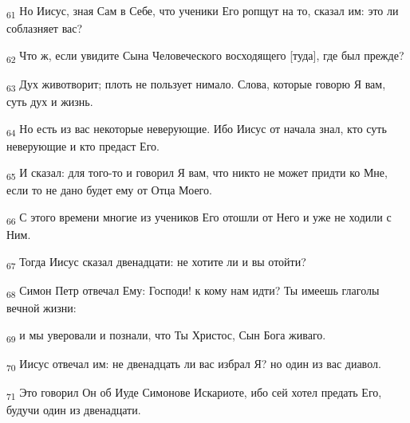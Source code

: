 \begin{tcolorbox}
\textsubscript{61} Но Иисус, зная Сам в Себе, что ученики Его ропщут на то, сказал им: это ли соблазняет вас?
\end{tcolorbox}
\begin{tcolorbox}
\textsubscript{62} Что ж, если увидите Сына Человеческого восходящего [туда], где был прежде?
\end{tcolorbox}
\begin{tcolorbox}
\textsubscript{63} Дух животворит; плоть не пользует нимало. Слова, которые говорю Я вам, суть дух и жизнь.
\end{tcolorbox}
\begin{tcolorbox}
\textsubscript{64} Но есть из вас некоторые неверующие. Ибо Иисус от начала знал, кто суть неверующие и кто предаст Его.
\end{tcolorbox}
\begin{tcolorbox}
\textsubscript{65} И сказал: для того-то и говорил Я вам, что никто не может придти ко Мне, если то не дано будет ему от Отца Моего.
\end{tcolorbox}
\begin{tcolorbox}
\textsubscript{66} С этого времени многие из учеников Его отошли от Него и уже не ходили с Ним.
\end{tcolorbox}
\begin{tcolorbox}
\textsubscript{67} Тогда Иисус сказал двенадцати: не хотите ли и вы отойти?
\end{tcolorbox}
\begin{tcolorbox}
\textsubscript{68} Симон Петр отвечал Ему: Господи! к кому нам идти? Ты имеешь глаголы вечной жизни:
\end{tcolorbox}
\begin{tcolorbox}
\textsubscript{69} и мы уверовали и познали, что Ты Христос, Сын Бога живаго.
\end{tcolorbox}
\begin{tcolorbox}
\textsubscript{70} Иисус отвечал им: не двенадцать ли вас избрал Я? но один из вас диавол.
\end{tcolorbox}
\begin{tcolorbox}
\textsubscript{71} Это говорил Он об Иуде Симонове Искариоте, ибо сей хотел предать Его, будучи один из двенадцати.
\end{tcolorbox}
